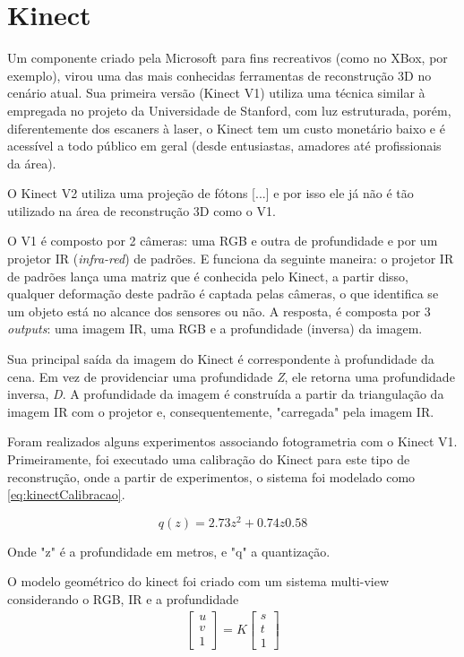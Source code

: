 \chapter{Kinect}\label{sec:kinect}
Um componente criado pela Microsoft para fins recreativos (como no XBox, por exemplo), virou uma das mais conhecidas ferramentas de reconstrução 3D no cenário atual. Sua primeira versão (Kinect V1) utiliza uma técnica similar à empregada no projeto da Universidade de Stanford, com luz estruturada, porém, diferentemente dos escaners à laser, o Kinect tem um custo monetário baixo e é acessível a todo público em geral (desde entusiastas, amadores até profissionais da área). 

O Kinect V2 utiliza uma projeção de fótons [...] e por isso ele já não é tão utilizado na área de reconstrução 3D como o V1. 

O V1 é composto por 2 câmeras: uma RGB e outra de profundidade e por um projetor IR ({\it infra-red}) de padrões. E funciona da seguinte maneira: o projetor IR de padrões lança uma matriz que é conhecida pelo Kinect, a partir disso, qualquer deformação deste padrão é captada pelas câmeras, o que identifica se um objeto está no alcance dos sensores ou não. A resposta, é composta por 3 {\it outputs}: uma imagem IR,  uma RGB e a profundidade (inversa) da imagem.


Sua principal saída da imagem do Kinect é correspondente à profundidade da cena. Em vez de providenciar uma profundidade {\it Z}, ele retorna uma profundidade inversa, {\it D}.
A profundidade da imagem é construída a partir da triangulação da imagem IR com o projetor e, consequentemente, "carregada" pela imagem IR.

 
Foram realizados alguns experimentos associando fotogrametria com o Kinect V1. Primeiramente, foi executado uma calibração do Kinect para este tipo de reconstrução, onde a partir de experimentos, o sistema foi modelado como \ref{eq:kinectCalibracao}.

\begin{equation}
\label{eq:kinectCalibracao}
q(z)=2.73z^{2}+0.74z 0.58
\end{equation}

Onde "z" é a profundidade em metros, e "q" a quantização.

O modelo geométrico do kinect foi criado com um sistema multi-view considerando o RGB, IR e a profundidade
\begin{gather} 
\label{eq:matrix}
\begin{bmatrix}
u\\
v\\
1
\end{bmatrix} 
= K
\begin{bmatrix}
s\\
t\\
1
\end{bmatrix}
\end{gather}

